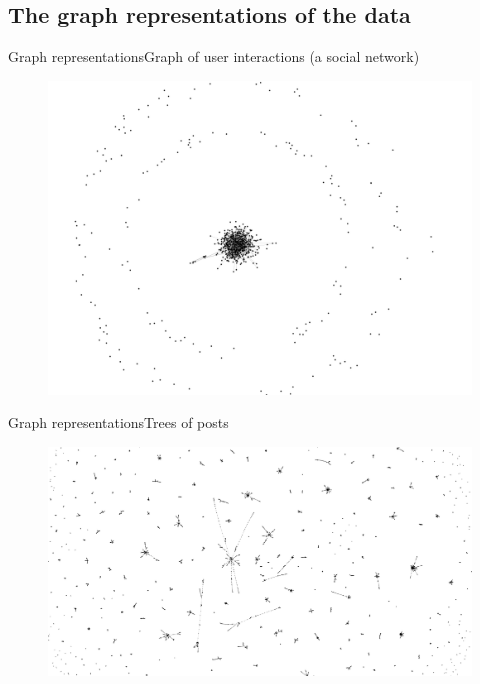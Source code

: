 \documentclass{beamer}
\begin{document}
\subsection{The graph representations of the data}

\begin{frame}{Graph representations}{Graph of user interactions (a social network)}
	\begin{figure}
		\centering
		\includegraphics[width=1\textwidth]{sna}	
	\end{figure}
\end{frame}

\begin{frame}{Graph representations}{Trees of posts}
\begin{figure}
	\centering
	\includegraphics[width=1\textwidth]{forest}	
\end{figure}
\end{frame}
\end{document}
